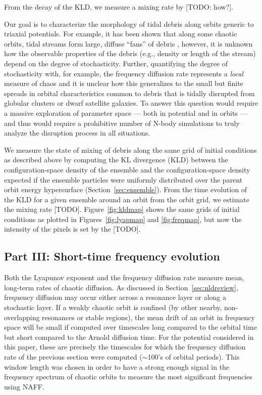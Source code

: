 \documentclass[letterpaper,12pt,preprint]{aastex}
\begin{document}
From the decay of the KLD, we measure a mixing rate by [TODO: how?].

Our goal is to characterize the morphology of tidal debris along orbits generic to triaxial potentials. For example, it has been shown that along some chaotic orbits, tidal streams form large, diffuse ``fans'' of debris \citep[e.g.][]{fardal14, pearson15}, however, it is unknown how the observable properties of the debris (e.g., density or length of the stream) depend on the degree of stochasticity. Further, quantifying the degree of stochasticity with, for example, the frequency diffusion rate represents a \emph{local} measure of chaos and it is unclear how this generalizes to the small but finite spreads in orbital characteristics common to debris that is tidally disrupted from globular clusters or dwarf satellite galaxies. To answer this question would require a massive exploration of parameter space --- both in potential and in orbits --- and thus would require a prohibitive number of N-body simulations to truly analyze the disruption process in all situations.

We measure the state of mixing of debris along the same grid of initial conditions as described above by computing the KL divergence (KLD) between the configuration-space density of the ensemble and the configuration-space density expected if the ensemble particles were uniformly distributed over the parent orbit energy hypersurface (Section~\ref{sec:ensemble}). From the time evolution of the KLD for a given ensemble around an orbit from the orbit grid, we estimate the mixing rate [TODO]. Figure~\ref{fig:kldmap} shows the same grids of initial conditions as plotted in Figures~\ref{fig:lyapmap} and \ref{fig:freqmap}, but now the intensity of the pixels is set by the [TODO].

\subsection{Part III: Short-time frequency evolution}\label{sec:results3}

Both the Lyapunov exponent and the frequency diffusion rate measure mean, long-term rates of chaotic diffusion. As discussed in Section~\ref{sec:nldreview}, frequency diffusion may occur either across a resonance layer or along a stochastic layer. If a weakly chaotic orbit is confined (by other nearby, non-overlapping resonances or stable regions), the mean drift of an orbit in frequency space will be small if computed over timescales long compared to the orbital time but short compared to the Arnold diffusion time. For the potential considered in this paper, these are precisely the timescales for which the frequency diffusion rate of the previous section were computed ($\sim$100's of orbital periods). This window length was chosen in order to have a strong enough signal in the frequency spectrum of chaotic orbits to measure the most significant frequencies using NAFF. 
\end{document}

